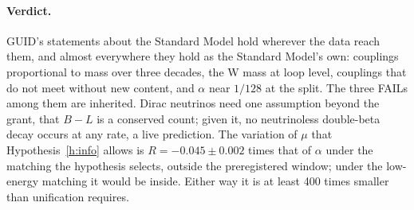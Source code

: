 \paragraph{Verdict.} GUID's statements about the Standard Model hold wherever the data reach them, and almost everywhere they hold as the Standard
Model's own: couplings proportional to mass over three decades, the W mass at loop level, couplings that do not meet without new content, and
$\alpha$ near $1/128$ at the split. The three FAILs among them are inherited. Dirac neutrinos need one assumption beyond the grant, that $B-L$ is a
conserved count; given it, no neutrinoless double-beta decay occurs at any rate, a live prediction. The variation of $\mu$ that
Hypothesis~\ref{h:info} allows is $R=-0.045\pm0.002$ times that of $\alpha$ under the matching the hypothesis selects, outside the preregistered
window; under the low-energy matching it would be inside. Either way it is at least 400 times smaller than unification requires.
